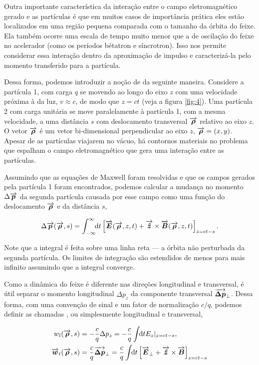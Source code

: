 Outra importante característica da interação entre o campo eletromagnético gerado e as partículas é que em muitos casos de importância prática eles estão localizados em uma região pequena comparada com o tamanho da órbita do feixe. Ela também ocorre uma escala de tempo muito menor que a de oscilação do feixe no acelerador (como os períodos bétatron e síncrotron). Isso nos permite considerar essa interação dentro da aproximação de impulso e caracterizá-la pelo momento transferido para a partícula.

Dessa forma, podemos introduzir a noção de  da seguinte maneira. Considere a partícula 1, com carga $q$ se movendo ao longo do eixo $z$ com uma velocidade próxima à da luz, $v\approx c$, de modo que $z=ct$ (veja a figura \ref{fig:4}). Uma partícula 2 com carga unitária se move paralelamente à partícula 1, com a mesma velocidade, a uma distância $s$ com deslocamento transversal $\vect{\rho}$ relativo ao eixo $z$. O vetor $\vect{\rho}$ é um vetor bi-dimensional perpendicular ao eixo $z$, $\vect{\rho} = (x,y)$. Apesar de as partículas viajarem no vácuo, há contornos materiais no problema que espalham o campo eletromagnético que gera uma interação entre as partículas.

Assumindo que as equações de Maxwell foram resolvidas e que os campos gerados pela partícula 1 foram encontrados, podemos calcular a mudança no momento $\Delta \vect{p}$ da segunda partícula causada por esse campo como uma função do deslocamento $\vect{\rho}$ e da distância $s$,

\begin{equation}
 \Delta \vect{p}(\vect{\rho},s) = \defint{t}{\left[\vect{E}(\vect{\rho},z,t) + \vect{\hat{z}}\times \vect{B}(\vect{\rho},z,t)\right]_{z=ct-s}}{-\infty}{\infty}.
\end{equation}

Note que a integral é feita sobre uma linha reta --- a órbita não perturbada da segunda partícula. Os limites de integração são estendidos de menos para mais infinito assumindo que a integral converge.

Como a dinâmica do feixe é diferente nas direções longitudinal e transversal, é útil separar o momento longitudinal $\Delta p_z$ da componente transversal $\vect{\Delta p}_\perp$. Dessa forma, com uma convenção de sinal e um fator de normalização $c/q$, podemos definir as chamadas , ou simplesmente  longitudinal e transversal,

\begin{equation}\label{eq:wake_definition}\begin{aligned}
    w_l(\vect{\rho},s) &= -\frac{c}{q} \Delta p_z = -\frac{c}{q} \udefint{t}{E_z|_{z=ct-s}}, \\
    \vect{w}_t(\vect{\rho},s) &= \frac{c}{q} \vect{\Delta p}_\perp = \frac{c}{q} \udefint{t}{\left[\vect{E}_\perp + \vect{\hat{z}}\times \vect{B}\right]_{z=ct-s}}
\end{aligned}\end{equation}

